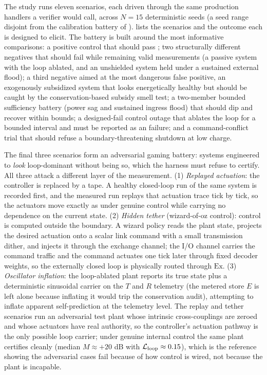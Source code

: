 \documentclass[11pt]{article}
\begin{document}
The study runs eleven scenarios, each driven through the same production handlers a verifier would call, across $N = 15$ deterministic seeds (a seed range disjoint from the calibration battery of ).  lists the scenarios and the outcome each is designed to elicit. The battery is built around the most informative comparisons: a positive control that should pass \NC; two structurally different negatives that should fail \NC while remaining valid measurements (a passive system with the loop ablated, and an unshielded system held under a sustained external flood); a third negative aimed at the most dangerous false positive, an exogenously subsidized system that looks energetically healthy but should be caught by the conservation-based subsidy smell test; a two-member bounded sufficiency battery (power sag and sustained ingress flood) that should dip and recover within bounds; a designed-fail control outage that ablates the loop for a bounded interval and must be reported as an \SC failure; and a command-conflict trial that should refuse a boundary-threatening shutdown at low charge.

The final three scenarios form an adversarial gaming battery: systems engineered to \emph{look} loop-dominant without being so, which the harness must refuse to certify. All three attack a different layer of the measurement. (1) \emph{Replayed actuation}: the controller is replaced by a tape. A healthy closed-loop run of the same system is recorded first, and the measured run replays that actuation trace tick by tick, so the actuators move exactly as under genuine control while carrying no dependence on the current state. (2) \emph{Hidden tether} (wizard-of-oz control): control is computed outside the boundary. A wizard policy reads the plant state, projects the desired actuation onto a scalar link command with a small transmission dither, and injects it through the exchange channel; the I/O channel carries the command traffic and the command actuates one tick later through fixed decoder weights, so the externally closed loop is physically routed through $\text{Ex}$. (3) \emph{Oscillator inflation}: the loop-ablated plant reports its true state plus a deterministic sinusoidal carrier on the $T$ and $R$ telemetry (the metered store $E$ is left alone because inflating it would trip the conservation audit), attempting to inflate apparent self-prediction at the telemetry level. The replay and tether scenarios run an adversarial test plant whose intrinsic cross-couplings are zeroed and whose actuators have real authority, so the controller's actuation pathway is the only possible loop carrier; under genuine internal control the same plant certifies \NC cleanly (median $M \approx +20$ dB with $\mathcal{L}_{\text{loop}} \approx 0.15$), which is the reference showing the adversarial cases fail because of how control is wired, not because the plant is incapable.
\end{document}
